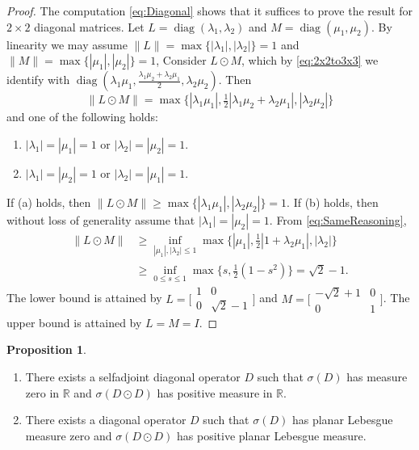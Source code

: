 \documentclass[10pt,reqno]{amsart}
\newcommand{\0}{{\color{lightgray}0}}
\newcommand{\R}{\mathbb{R}}
\renewcommand{\geq}{\geqslant}
\newcommand{\diag}{\operatorname{diag}}
\newcommand{\norm}[1]{\| #1 \|}
\theoremstyle{definition}
\newtheorem{Proposition}[equation]{Proposition}
\numberwithin{equation}{section}
\begin{document}
\begin{proof}
The computation \eqref{eq:Diagonal} shows that it suffices to prove the result for $2 \times 2$ diagonal matrices.
Let $L = \diag(\lambda_1,\lambda_2)$ and $M = \diag(\mu_1,\mu_2)$. 
By linearity we may assume $\norm{L}=\max\{ |\lambda_1|,|\lambda_2| \}=1$ and 
$\norm{M}=\max\{ |\mu_1|,|\mu_2|\}=1$,
Consider
$L \odot M$, which by \eqref{eq:2x2to3x3} we identify with 
$\diag( \lambda_1 \mu_1 , \frac{\lambda_1 \mu_2 + \lambda_2 \mu_1}{2}, \lambda_2 \mu_2)$.  Then
\begin{equation}\label{eq:SameReasoning}
\norm{L \odot M}=\max\big\{ | \lambda_1 \mu_1|,\tfrac{1}{2}|\lambda_1 \mu_2 + \lambda_2 \mu_1|,|\lambda_2 \mu_2|\big\}
\end{equation}
and one of the following holds:
\begin{enumerate}
    \item $|\lambda_1|=|\mu_1|=1$ or $|\lambda_2|=|\mu_2|=1$. 
    \item $|\lambda_1|=|\mu_2|=1$ or $|\lambda_2|=|\mu_1|=1$. 
\end{enumerate}
If (a) holds, then $\norm{L \odot M} \geq \max\{ |\lambda_1\mu_1|,|\lambda_2\mu_2| \}=1$. 
If (b) holds, then without loss of generality assume that $|\lambda_1|=|\mu_2|=1$. From \eqref{eq:SameReasoning},
\begin{align}
    \norm{L \odot M} 
    &\geqslant \inf_{|\mu_1|, |\lambda_2| \leqslant 1}  \max \big\{|\mu_1|, \tfrac{1}{2}|1+\lambda_2  \mu_1|,|\lambda_2|\big\}  \\
    &\geqslant \inf_{0 \leqslant s\leqslant 1}  \max \{s, \tfrac{1}{2}(1-  s^2)\}  
    = \sqrt{2} - 1.
\end{align}
The lower bound is attained by $L= \big[\begin{smallmatrix}
 1 & 0 \\ 0  & \sqrt{2}-1\end{smallmatrix}\big]$ and $M= \big[ \begin{smallmatrix}-\sqrt{2}+1& 0 \\ 0&1\end{smallmatrix}\big]$. 
The upper bound is attained by $L=M=I$.
\end{proof}


\begin{Proposition}
\begin{enumerate}
\item There exists a selfadjoint diagonal operator $D$ such that $\sigma(D)$ has measure zero in $\R$
and $\sigma(D\odot D)$ has positive measure in $\R$.

\item There exists a diagonal operator $D$ such that $\sigma(D)$ has planar Lebesgue measure zero
and $\sigma(D\odot D)$ has positive planar Lebesgue measure.
\end{enumerate}
\end{Proposition}
\end{document}
